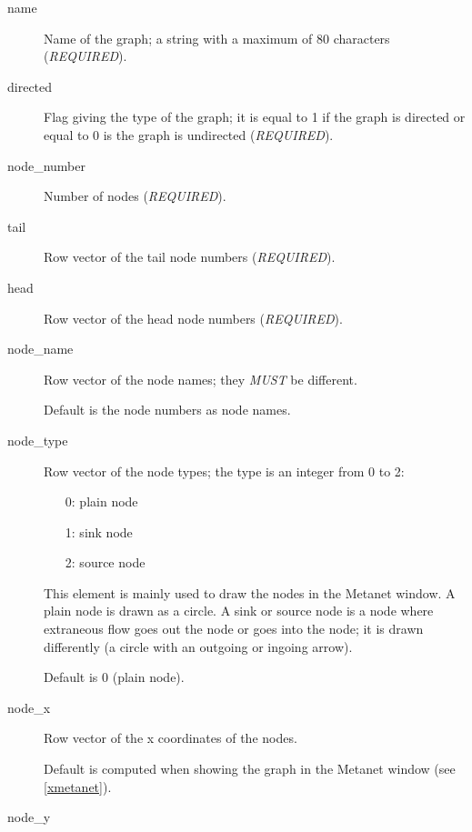 \documentclass[11pt]{article}
\begin{document}
\begin{description}
  \item[name] 

Name of the graph; a string with a maximum of 80
characters (\emph{REQUIRED}).

  \item[directed]

Flag giving the type of the graph; it is equal to 1 if the graph is
directed or equal to 0 is the graph is undirected (\emph{REQUIRED}).

  \item[node\_number]

Number of nodes (\emph{REQUIRED}).

  \item[tail]

Row vector of the tail node numbers (\emph{REQUIRED}).

  \item[head]

Row vector of the head node numbers (\emph{REQUIRED}).

  \item[node\_name]

Row vector of the node names; they \emph{MUST} be different.

Default is the node numbers as node names.

  \item[node\_type]

Row vector of the node types; the type is an integer from 0 to 2:
\begin{itemize}
  \item[0:] plain node
  \item[1:] sink node
  \item[2:] source node
\end{itemize}

This element is mainly used to draw the nodes in the Metanet
window. A plain node is drawn as a circle. A sink or source node is a
node where extraneous flow goes out the node or goes into the node; it
is drawn differently (a circle with an outgoing or ingoing arrow).

Default is 0 (plain node).

  \item[node\_x]

Row vector of the x coordinates of the nodes.

Default is computed when showing the graph in the Metanet window
(see \ref{xmetanet}).

  \item[node\_y]


\end{description}
\end{document}
